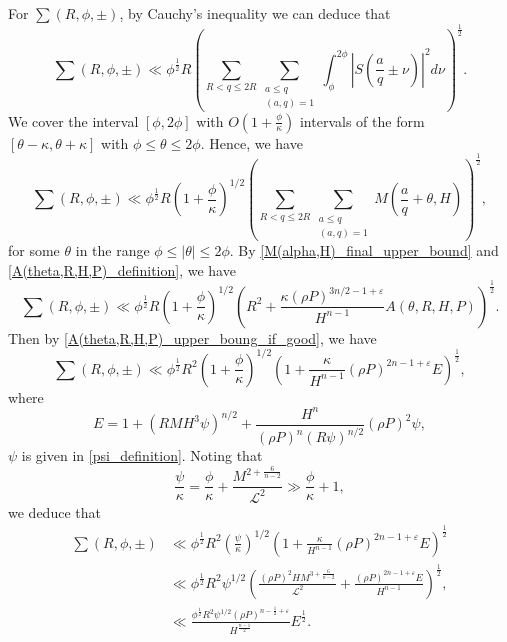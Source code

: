 \documentclass[12pt]{amsart}
\theoremstyle{definition}
\numberwithin{equation}{section}
\begin{document}
For $\sum(R,\phi,\pm)$, by Cauchy's inequality we can deduce that
\begin{equation*}
    \sum(R,\phi,\pm)\ll \phi^{\frac{1}{2}}R\left(\sum_{R < q \leq 2R}\sum_{\substack{a \leq q\\[3pt](a,q)=1}}\int_{\phi}^{2\phi} \left| S(\frac{a}{q} \pm \nu) \right|^2 d\nu\right)^{\frac{1}{2}}.
\end{equation*}
We cover the interval $[\phi,2\phi]$ with $ O(1+\frac{\phi}{\kappa})$ intervals of the form $[\theta-\kappa,\theta+\kappa]$ with $\phi\leq\theta\leq2\phi.$ Hence, we have
\begin{equation*}
    \sum(R,\phi,\pm)\ll \phi^{\frac{1}{2}}R\left(1+\frac{\phi}{\kappa}\right)^{1/2}\left(\sum_{R < q \leq 2R}\sum_{\substack{a \leq q\\[3pt](a,q)=1}}M\left(\frac{a}{q}+\theta,H\right)\right)^{\frac{1}{2}},
\end{equation*}
for some $\theta$ in the range $\phi\leq|\theta|\leq2\phi.$
By \eqref{M(alpha,H)_final_upper_bound} and \eqref{A(theta,R,H,P)_definition}, we have
\begin{equation*}
    \sum(R,\phi,\pm)\ll \phi^{\frac{1}{2}}R\left(1+\frac{\phi}{\kappa}\right)^{1/2}\left(R^2+\frac{\kappa (\rho P)^{3n/2-1+\varepsilon}}{H^{n-1}}A(\theta,R,H,P)\right)^{\frac{1}{2}}.
\end{equation*}
Then by \eqref{A(theta,R,H,P)_upper_boung_if_good}, we have
\begin{equation*}
    \sum(R,\phi,\pm)\ll \phi^{\frac{1}{2}}R^2\left(1+\frac{\phi}{\kappa}\right)^{1/2}\left(1+\frac{\kappa }{H^{n-1}}(\rho P)^{2n-1+\varepsilon}E\right)^{\frac{1}{2}},
\end{equation*}
where
\begin{equation}
    \label{E_definition}
    E=1+(RMH^3\psi)^{n/2}+\frac{H^n}{(\rho P)^n(R\psi)^{n/2}}(\rho P)^2\psi,
\end{equation}
$\psi$ is given in \eqref{psi_definition}.
Noting that
\begin{equation*}
    \frac{\psi}{\kappa}=\frac{\phi}{\kappa}+\frac{M^{2+\frac{6}{n-2}}}{\mathcal{L}^2} \gg \frac{\phi}{\kappa}+1,
\end{equation*}
we deduce that
\begin{equation*}
    \begin{split}
        \sum(R,\phi,\pm)
        &\ll \phi^{\frac{1}{2}}R^2\left(\frac{\psi}{\kappa}\right)^{1/2}\left(1+\frac{\kappa }{H^{n-1}}(\rho P)^{2n-1+\varepsilon}E\right)^{\frac{1}{2}}\\
        &\ll \phi^{\frac{1}{2}}R^2\psi^{1/2}\left(\frac{(\rho P)^2HM^{3+\frac{6}{n-2}}}{\mathcal{L}^2}+\frac{(\rho P)^{2n-1+\varepsilon}E}{H^{n-1}}\right)^{\frac{1}{2}},\\
        &\ll \frac{\phi^{\frac{1}{2}}R^2\psi^{1/2}(\rho P)^{n-\frac{1}{2}+\varepsilon}}{H^{\frac{n-1}{2}}}E^{\frac{1}{2}}.
    \end{split}
\end{equation*}
\end{document}
